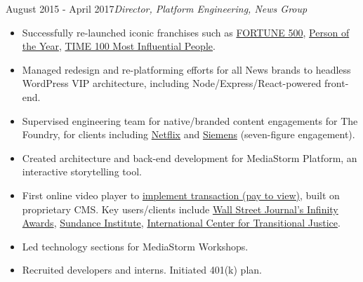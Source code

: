 \documentclass[a4paper,10pt]{memoir} %
\begin{document}
\CVItem{} {August 2015 - April 2017}{\textit{Director, Platform Engineering, News Group}}
\begin{itemize}
	\item Successfully re-launched iconic franchises such as \href{http://fortune.com/fortune500}{FORTUNE 500}, \href{http://time.com/time-person-of-the-year-2017-silence-breakers/}{Person of the Year}, \href{http://time.com/collection/most-influential-people-2018/}{TIME 100 Most Influential People}.

	\item Managed redesign and re-platforming efforts for all News brands to headless WordPress VIP architecture, including Node/Express/React-powered front-end.

	\item Supervised engineering team for native/branded content engagements for The Foundry, for clients including \href{http://time.com/paid-content-from/netflix/dinnertime/}{Netflix} and \href{http://time.com/partner/siemens/innovation-starts-here/}{Siemens} (seven-figure engagement).
\end{itemize}
\Sep %


\clearpage %
\userinformation %
\framebreak %


\begin{itemize}
	\item Created architecture and back-end development for MediaStorm Platform, an interactive storytelling tool. 
	\item First online video player to \href{http://time.com/46716/game-changer-mediastorm-launches-pay-per-story-video-player/}{implement transaction (pay to view)}, built on proprietary CMS. Key users/clients include \href{https://mediastorm.com/clients/2018-icp-infinity-awards}{Wall Street Journal's Infinity Awards}, \href{https://mediastorm.com/clients/sundance-short-film-challenge}{Sundance Institute}, \href{https://mediastorm.com/clients/i-am-not-who-they-think-i-am-for-ictj}{International Center for Transitional Justice}. 
	\item Led technology sections for MediaStorm Workshops.
	\item Recruited developers and interns. Initiated 401(k) plan.
\end{itemize}
\Sep %
\end{document}
